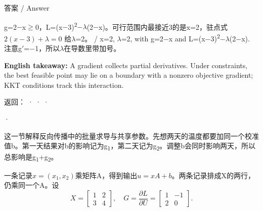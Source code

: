 \begin{StudySolution}{答案 / Answer}


g=2\ensuremath{-}x\ensuremath{\ge}0，L=(x\ensuremath{-}3)\textsuperscript{2}\ensuremath{-}\ensuremath{\lambda}(2\ensuremath{-}x)。可行范围内最接近3的是x=2，驻点式 \(2(x-3)+\lambda=0\) 给\ensuremath{\lambda}=2。 / x=2, \ensuremath{\lambda}=2, with g=2\ensuremath{-}x and L=(x\ensuremath{-}3)\textsuperscript{2}\ensuremath{-}\ensuremath{\lambda}(2\ensuremath{-}x). 注意g\ensuremath{\prime}=\ensuremath{-}1，所以\ensuremath{\lambda}在导数里带加号。


\end{StudySolution}


\textbf{English takeaway:} A gradient collects partial derivatives. Under constraints, the best feasible point may lie on a boundary with a nonzero objective gradient; KKT conditions track this interaction.


返回： ·  ·  · 








 · 


这一节解释反向传播中的批量求导与共享参数。先想两天的温度都要加同一个校准值b。第一天结果对b的影响记为g\textsubscript{1}，第二天记为g\textsubscript{2}。调整b会同时影响两天，所以总影响是g\textsubscript{1}+g\textsubscript{2}。









一条记录\(x=(x_1,x_2)\)乘矩阵A，得到输出\(u=xA+b\)。两条记录排成X的两行，仍乘同一个A。设
\[
X=\begin{bmatrix}1&2\\3&4\end{bmatrix},\quad
G=\frac{\partial L}{\partial U}=\begin{bmatrix}1&-1\\2&0\end{bmatrix}.\tag{M.38}
\]


